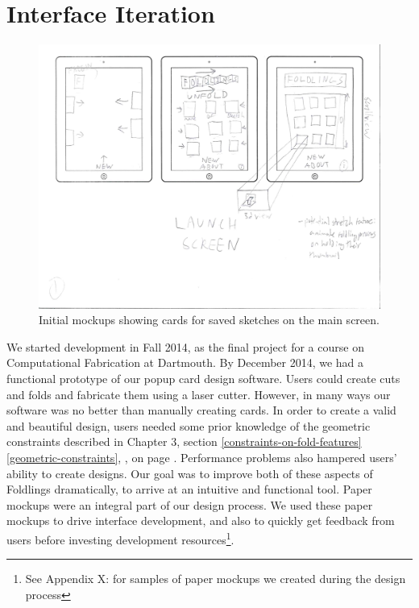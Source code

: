 \section{Interface Iteration}\label{interface-iteration}

\begin{figure}[htbp]
\centering
\includegraphics{figures/90_Appendix_UI_Mockups/001.png}
\caption{Initial mockups showing cards for saved sketches on the main
screen.}
\end{figure}

We started development in Fall 2014, as the final project for a course
on Computational Fabrication at Dartmouth. By December 2014, we had a
functional prototype of our popup card design software. Users could
create cuts and folds and fabricate them using a laser cutter. However,
in many ways our software was no better than manually creating cards. In
order to create a valid and beautiful design, users needed some prior
knowledge of the geometric constraints described in Chapter 3, section
\ref{constraints-on-fold-features} \ref{geometric-constraints},
, on page
\pageref{geometric-constraints}. Performance problems also hampered
users' ability to create designs. Our goal was to improve both of these
aspects of Foldlings dramatically, to arrive at an intuitive and
functional tool. Paper mockups were an integral part of our design
process. We used these paper mockups to drive interface development, and
also to quickly get feedback from users before investing development
resources\footnote{See Appendix X: for samples of paper mockups we
  created during the design process}.

